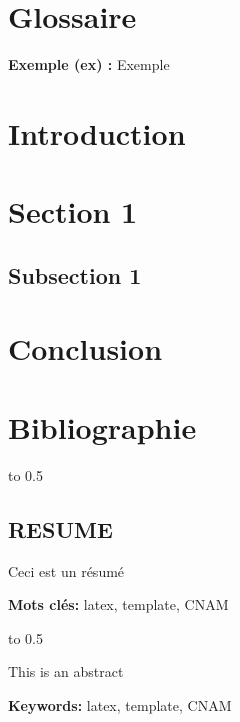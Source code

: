 \documentclass[12pt]{article}
\begin{document}
\newpage

\section*{Glossaire}

\textbf{Exemple (ex) :} Exemple\\

\newpage 

\section*{Introduction}

\newpage

\section{Section 1}
\subsection{Subsection 1}

\newpage

\section{Conclusion}

\newpage

\begingroup
\setlength{\parindent}{0pt}  %

\section*{Bibliographie}

\endgroup  %

\newpage

\centerline{\hbox to 0.5\textwidth{\hrulefill}}

\begin{center}

\section*{RESUME}

\end{center}

Ceci est un résumé

\textbf{Mots clés:} latex, template, CNAM\\

\centerline{\hbox to 0.5\textwidth{\hrulefill}}

\begin{center}


\end{center}

This is an abstract

\textbf{Keywords:} latex, template, CNAM
\end{document}
